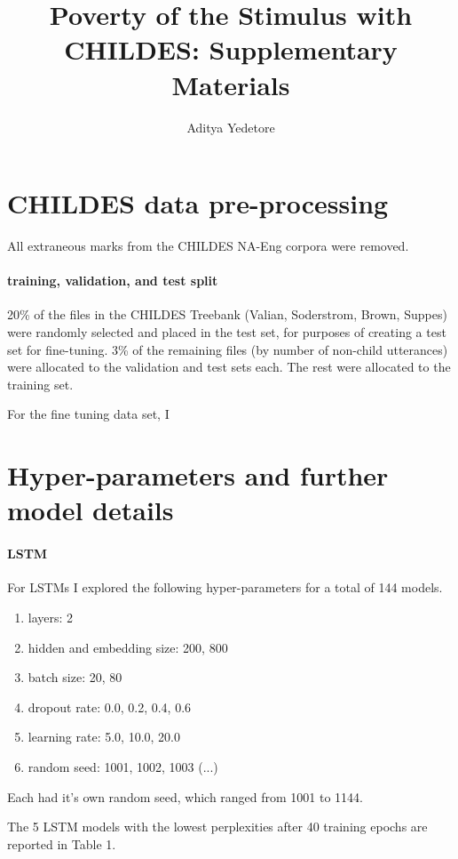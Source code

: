 \documentclass{article}
\title{Poverty of the Stimulus with CHILDES: Supplementary Materials}
\author{Aditya Yedetore}
\date{}
\begin{document}
\maketitle

\section*{CHILDES data pre-processing}
All extraneous marks from the CHILDES NA-Eng corpora were removed. 

\paragraph{training, validation, and test split}
20\% of the files in the CHILDES Treebank (Valian, Soderstrom, Brown, Suppes) were randomly selected and placed in the test set, for purposes of creating a test set for fine-tuning. 3\% of the remaining files (by number of non-child utterances) were allocated to the validation and test sets each. The rest were allocated to the training set. 

For the fine tuning data set, I 

\section*{Hyper-parameters and further model details}
\paragraph{LSTM} For LSTMs I explored the following hyper-parameters for a total of 144 models. 

\begin{enumerate}
    \item layers: 2
    \item hidden and embedding size: 200, 800
    \item batch size: 20, 80 
    \item dropout rate: 0.0, 0.2, 0.4, 0.6 
    \item learning rate: 5.0, 10.0, 20.0
    \item random seed: 1001, 1002, 1003 (...)
\end{enumerate}

Each had it's own random seed, which ranged from 1001 to 1144. 

The 5 LSTM models with the lowest perplexities after 40 training epochs are reported in Table 1. 
\end{document}
